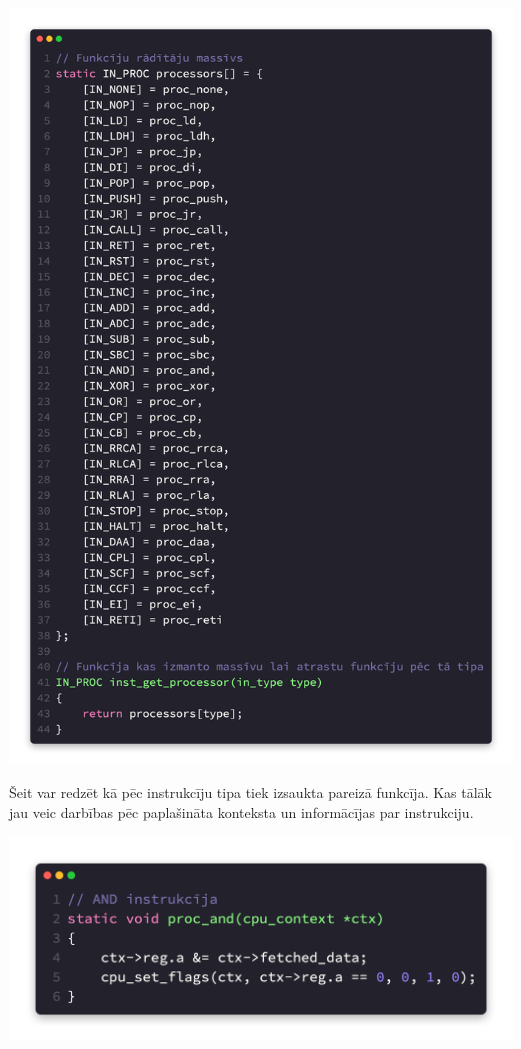 \documentclass[12pt]{article}
\begin{document}
	\includegraphics[scale=0.25]{img/instrproc.png}
	
	Šeit var redzēt kā pēc instrukcīju tipa tiek izsaukta pareizā funkcīja. Kas tālāk jau veic darbības pēc paplašināta konteksta un informācījas par instrukciju.
	
	\pagebreak
	
	\includegraphics[scale=0.5]{img/instrand.png}
	
\end{document}
